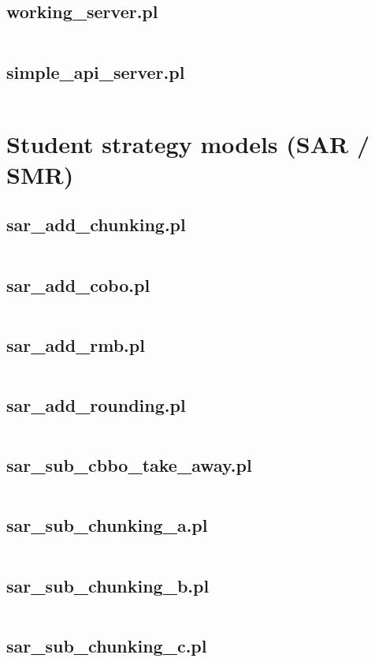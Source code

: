 \documentclass{article}
\begin{document}
\subsection{working\_server.pl}
\inputminted{prolog}{working_server.pl}
\subsection{simple\_api\_server.pl}
\inputminted{prolog}{simple_api_server.pl}

\section{Student strategy models (SAR / SMR)}
\subsection{sar\_add\_chunking.pl}
\inputminted{prolog}{sar_add_chunking.pl}
\subsection{sar\_add\_cobo.pl}
\inputminted{prolog}{sar_add_cobo.pl}
\subsection{sar\_add\_rmb.pl}
\inputminted{prolog}{sar_add_rmb.pl}
\subsection{sar\_add\_rounding.pl}
\inputminted{prolog}{sar_add_rounding.pl}
\subsection{sar\_sub\_cbbo\_take\_away.pl}
\inputminted{prolog}{sar_sub_cbbo_take_away.pl}
\subsection{sar\_sub\_chunking\_a.pl}
\inputminted{prolog}{sar_sub_chunking_a.pl}
\subsection{sar\_sub\_chunking\_b.pl}
\inputminted{prolog}{sar_sub_chunking_b.pl}
\subsection{sar\_sub\_chunking\_c.pl}
\inputminted{prolog}{sar_sub_chunking_c.pl}
\end{document}
